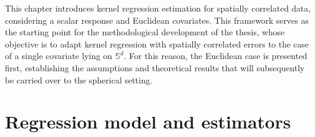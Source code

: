 \documentclass[12pt]{report} %
\newcommand{\Sd}{\mathbb{S}^{d}}
\begin{document}
This chapter introduces kernel regression estimation for spatially correlated data, considering a scalar response and Euclidean covariates. This framework serves as the starting point for the methodological development of the thesis, whose objective is to adapt kernel regression with spatially correlated errors to the case of a single covariate lying on $\mathbb{S}^d$. For this reason, the Euclidean case is presented first, establishing the assumptions and theoretical results that will subsequently be carried over to the spherical setting.

\section{Regression model and estimators}\label{sec:Eucl-spat-est}
\end{document}

